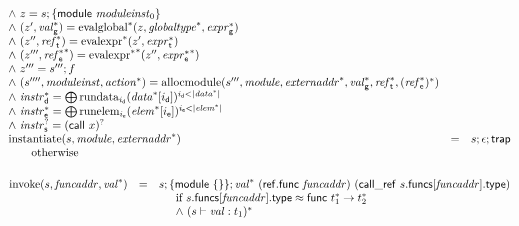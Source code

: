 $$\begin{array}[t]{@{}lcl@{}l@{}}
{\begin{array}[t]{@{}l@{}}
{\land}~ z = s ; \{ \mathsf{module}~{\mathit{moduleinst}}_0 \} \\
{\land}~ ({z'}, {{\mathit{val}}_{\mathsf{g}}^\ast}) = {{{\mathrm{evalglobal}}^\ast}}{(z, {{\mathit{globaltype}}^\ast}, {{\mathit{expr}}_{\mathsf{g}}^\ast})} \\
{\land}~ ({z''}, {{\mathit{ref}}_{\mathsf{t}}^\ast}) = {{{\mathrm{evalexpr}}^\ast}}{({z'}, {{\mathit{expr}}_{\mathsf{t}}^\ast})} \\
{\land}~ ({z'''}, {{{\mathit{ref}}_{\mathsf{e}}^\ast}^\ast}) = {{{{\mathrm{evalexpr}}^\ast}^\ast}}{({z''}, {{{\mathit{expr}}_{\mathsf{e}}^\ast}^\ast})} \\
{\land}~ {z'''} = {s'''} ; f \\
{\land}~ ({s''''}, {\mathit{moduleinst}}, {{\mathit{action}}^\ast}) = {\mathrm{allocmodule}}({s'''}, {\mathit{module}}, {{\mathit{externaddr}}^\ast}, {{\mathit{val}}_{\mathsf{g}}^\ast}, {{\mathit{ref}}_{\mathsf{t}}^\ast}, {({{\mathit{ref}}_{\mathsf{e}}^\ast})^\ast}) \\
{\land}~ {{\mathit{instr}}_{\mathsf{d}}^\ast} = {\bigoplus}\, {{{\mathrm{rundata}}}_{i_{\mathsf{d}}}({{\mathit{data}}^\ast}{}[i_{\mathsf{d}}])^{i_{\mathsf{d}}<{|{{\mathit{data}}^\ast}|}}} \\
{\land}~ {{\mathit{instr}}_{\mathsf{e}}^\ast} = {\bigoplus}\, {{{\mathrm{runelem}}}_{i_{\mathsf{e}}}({{\mathit{elem}}^\ast}{}[i_{\mathsf{e}}])^{i_{\mathsf{e}}<{|{{\mathit{elem}}^\ast}|}}} \\
{\land}~ {{\mathit{instr}}_{\mathsf{s}}^?} = {(\mathsf{call}~x)^?} \\
\end{array}
} \\
{\mathrm{instantiate}}(s, {\mathit{module}}, {{\mathit{externaddr}}^\ast}) & = & s ; \epsilon ; \mathsf{trap} &  \\
 \multicolumn{4}{@{}l@{}}{\quad
\quad \mbox{otherwise}
} \\
\end{array}
$$

\vspace{1ex}

$$
\begin{array}[t]{@{}lcl@{}l@{}}
{\mathrm{invoke}}(s, {\mathit{funcaddr}}, {{\mathit{val}}^\ast}) & = & s ; \{ \mathsf{module}~\{  \} \} ; {{\mathit{val}}^\ast}~(\mathsf{ref{.}func}~{\mathit{funcaddr}})~(\mathsf{call\_ref}~s{.}\mathsf{funcs}{}[{\mathit{funcaddr}}]{.}\mathsf{type}) &  \\
&& \multicolumn{2}{@{}l@{}}{\quad
\quad
\begin{array}[t]{@{}l@{}}
\mbox{if}~ s{.}\mathsf{funcs}{}[{\mathit{funcaddr}}]{.}\mathsf{type} \approx \mathsf{func}~{t_1^\ast} \rightarrow {t_2^\ast} \\
{\land}~ (s \vdash {\mathit{val}} : t_1)^\ast \\
\end{array}
} \\
\end{array}
$$

